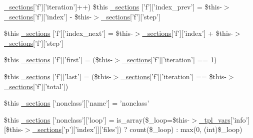 \begin{DoxyCompactItemize}
\hyperlink{_06_06127_05_06_0612781687_05pkgelementindex_8tpl_8php_a9e3d26b39edfe29c3f29b8035ef33828}{\-\_\-sections}\mbox{[}'f'\mbox{]}\mbox{[}'iteration'\mbox{]}++) \*
\$this \hyperlink{_06_06-72_05_06_06-727729411_05left__frame_8tpl_8php_a82ad06b727c302bcad51d4d582efd3fe}{\-\_\-sections} \mbox{[}'f'\mbox{]}\mbox{[}'index\-\_\-prev'\mbox{]} = \$this-\/$>$\hyperlink{_06_06127_05_06_0612781687_05pkgelementindex_8tpl_8php_a9e3d26b39edfe29c3f29b8035ef33828}{\-\_\-sections}\mbox{[}'f'\mbox{]}\mbox{[}'index'\mbox{]} -\/ \$this-\/$>$\hyperlink{_06_06127_05_06_0612781687_05pkgelementindex_8tpl_8php_a9e3d26b39edfe29c3f29b8035ef33828}{\-\_\-sections}\mbox{[}'f'\mbox{]}\mbox{[}'step'\mbox{]}
\item 
\$this \hyperlink{_06_06-72_05_06_06-727729411_05left__frame_8tpl_8php_a00e2d390cb334e33c792c0952001367c}{\-\_\-sections} \mbox{[}'f'\mbox{]}\mbox{[}'index\-\_\-next'\mbox{]} = \$this-\/$>$\hyperlink{_06_06127_05_06_0612781687_05pkgelementindex_8tpl_8php_a9e3d26b39edfe29c3f29b8035ef33828}{\-\_\-sections}\mbox{[}'f'\mbox{]}\mbox{[}'index'\mbox{]} + \$this-\/$>$\hyperlink{_06_06127_05_06_0612781687_05pkgelementindex_8tpl_8php_a9e3d26b39edfe29c3f29b8035ef33828}{\-\_\-sections}\mbox{[}'f'\mbox{]}\mbox{[}'step'\mbox{]}
\item 
\$this \hyperlink{_06_06-72_05_06_06-727729411_05left__frame_8tpl_8php_ae3d958e692b79999dd4067e8461ddc7c}{\-\_\-sections} \mbox{[}'f'\mbox{]}\mbox{[}'first'\mbox{]} = (\$this-\/$>$\hyperlink{_06_06127_05_06_0612781687_05pkgelementindex_8tpl_8php_a9e3d26b39edfe29c3f29b8035ef33828}{\-\_\-sections}\mbox{[}'f'\mbox{]}\mbox{[}'iteration'\mbox{]} == 1)
\item 
\$this \hyperlink{_06_06-72_05_06_06-727729411_05left__frame_8tpl_8php_ae156c09345aced1d2bd29704d13638e3}{\-\_\-sections} \mbox{[}'f'\mbox{]}\mbox{[}'last'\mbox{]} = (\$this-\/$>$\hyperlink{_06_06127_05_06_0612781687_05pkgelementindex_8tpl_8php_a9e3d26b39edfe29c3f29b8035ef33828}{\-\_\-sections}\mbox{[}'f'\mbox{]}\mbox{[}'iteration'\mbox{]} == \$this-\/$>$\hyperlink{_06_06127_05_06_0612781687_05pkgelementindex_8tpl_8php_a9e3d26b39edfe29c3f29b8035ef33828}{\-\_\-sections}\mbox{[}'f'\mbox{]}\mbox{[}'total'\mbox{]})
\item 
\$this \hyperlink{_06_06-72_05_06_06-727729411_05left__frame_8tpl_8php_aa3fd1bc75f8f9917ae1e04e4d26a5f2d}{\-\_\-sections} \mbox{[}'nonclass'\mbox{]}\mbox{[}'name'\mbox{]} = 'nonclass'
\item 
\$this \hyperlink{_06_06-72_05_06_06-727729411_05left__frame_8tpl_8php_a537a1f0b31e38109acfe6498cf4983ca}{\-\_\-sections} \mbox{[}'nonclass'\mbox{]}\mbox{[}'loop'\mbox{]} = is\-\_\-array(\$\-\_\-loop=\$this-\/$>$\hyperlink{_06_06127_05_06_0612781687_05pkgelementindex_8tpl_8php_a4a4846d8e68d455590131a05697f67a3}{\-\_\-tpl\-\_\-vars}\mbox{[}'info'\mbox{]}\mbox{[}\$this-\/$>$\hyperlink{_06_06127_05_06_0612781687_05pkgelementindex_8tpl_8php_a9e3d26b39edfe29c3f29b8035ef33828}{\-\_\-sections}\mbox{[}'p'\mbox{]}\mbox{[}'index'\mbox{]}\mbox{]}\mbox{[}'files'\mbox{]}) ? count(\$\-\_\-loop) \-: max(0, (int)\$\-\_\-loop)

\end{DoxyCompactItemize}
